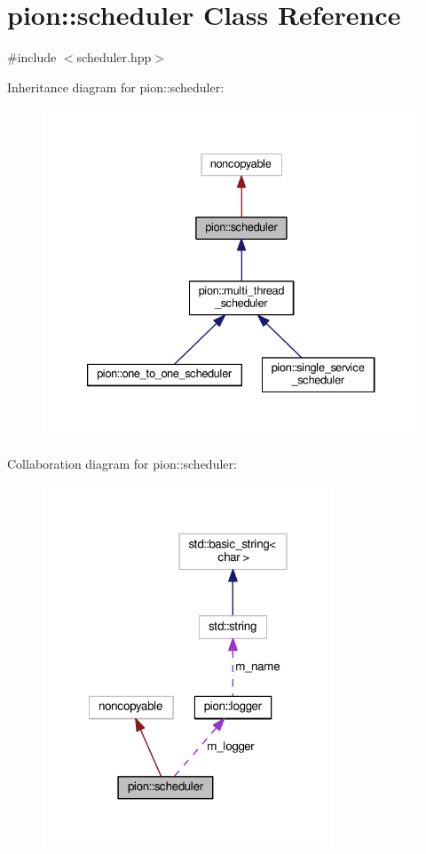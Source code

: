 \hypertarget{classpion_1_1scheduler}{\section{pion\-:\-:scheduler Class Reference}
\label{classpion_1_1scheduler}
}


{\ttfamily \#include $<$scheduler.\-hpp$>$}



Inheritance diagram for pion\-:\-:scheduler\-:
\nopagebreak
\begin{figure}[H]
\begin{center}
\leavevmode
\includegraphics[width=333pt]{classpion_1_1scheduler__inherit__graph}
\end{center}
\end{figure}


Collaboration diagram for pion\-:\-:scheduler\-:
\nopagebreak
\begin{figure}[H]
\begin{center}
\leavevmode
\includegraphics[width=246pt]{classpion_1_1scheduler__coll__graph}
\end{center}
\end{figure}
